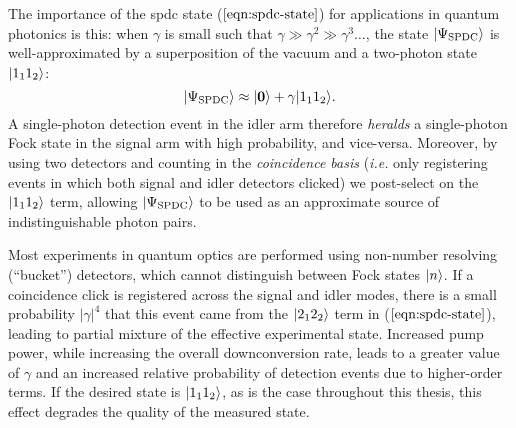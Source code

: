 The importance of the \gls{spdc} state ($\ref{eqn:spdc-state}$) for applications in quantum photonics is this: when $\gamma$ is small such that $\gamma \gg \gamma^2 \gg \gamma^3 \ldots$, the state $\mbox{$ | \Psi_\text{SPDC} \rangle $}$ is well-approximated by a superposition of the vacuum and a two-photon state $\mbox{$ | 1_11_2 \rangle $}$:
\begin{equation}
    \mbox{$ | \Psi_\text{SPDC} \rangle $} \approx \mbox{$ | \mathbf{0} \rangle $} + \gamma\mbox{$ | 1_11_2 \rangle $}.
\end{equation}
A single-photon detection event in the idler arm therefore \emph{heralds} a single-photon Fock state in the signal arm with high probability, and vice-versa. Moreover, by using two detectors and counting in the \emph{coincidence basis} (\emph{i.e.} only registering events in which both signal and idler detectors clicked) we post-select on the $\mbox{$ | 1_1 1_2 \rangle $}$ term, allowing $\mbox{$ | \Psi_\text{SPDC} \rangle $}$ to be used as an approximate source of indistinguishable photon pairs. 

Most experiments in quantum optics are performed using non-number resolving (``bucket'') detectors, which cannot distinguish between Fock states $\mbox{$ | n \rangle $}$. If a coincidence click is registered across the signal and idler modes,  there is a small probability $|\gamma|^4$ that this event came from the $\mbox{$ | 2_12_2 \rangle $}$ term in ($\ref{eqn:spdc-state}$), leading to partial mixture of the effective experimental state.  Increased pump power, while increasing the overall downconversion rate, leads to a greater value of $\gamma$ and an increased relative probability of detection events due to higher-order terms. If the desired state is $\mbox{$ | 1_11_2 \rangle $}$, as is the case throughout this thesis, this effect degrades the quality of the measured state. 

